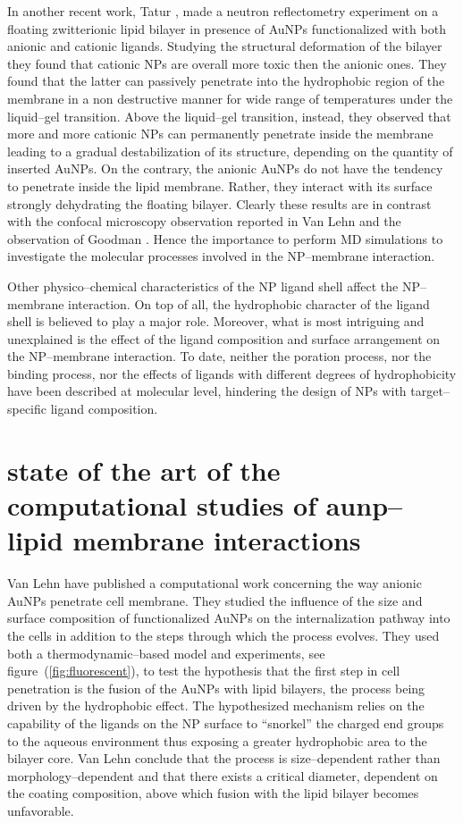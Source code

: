 In another recent work, Tatur \etal{} \cite{Maccarini2013}, made a neutron reflectometry experiment on a floating 
zwitterionic lipid bilayer in presence of \acp{AuNP} functionalized with both anionic and cationic ligands. 
Studying the structural deformation of the bilayer they found that cationic \acp{NP} are overall more toxic then 
the anionic ones. They found that the latter can passively penetrate into the hydrophobic region of the membrane 
in a non destructive manner for wide range of temperatures under the liquid--gel transition. Above the liquid--gel 
transition, instead, they observed that more and more cationic \acp{NP} can permanently penetrate inside the 
membrane leading to a gradual destabilization of its structure, depending on the quantity of inserted \acp{AuNP}. 
On the contrary, the anionic \acp{AuNP} do not have the tendency to penetrate inside the lipid membrane. Rather, 
they interact with its surface strongly dehydrating the floating bilayer. Clearly these results are in contrast 
with the confocal microscopy observation reported in Van Lehn \etal{} \cite{VanLehn2013} and the observation of 
Goodman \etal{} \cite{Goodman2004}. Hence the importance to perform \ac{MD} simulations to investigate the 
molecular processes involved in the \ac{NP}--membrane interaction.

Other physico--chemical characteristics of the \ac{NP} ligand shell affect the \ac{NP}--membrane interaction. On 
top of all, the hydrophobic character of the ligand shell is believed to play a major role. Moreover, what is most 
intriguing and unexplained is the effect of the ligand composition and surface arrangement on the 
\ac{NP}--membrane interaction. To date, neither the poration process, nor the binding process, nor the effects of 
ligands with different degrees of hydrophobicity have been described at molecular level, hindering the design of 
\acp{NP} with target--specific ligand composition.

\section{state of the art of the computational studies of aunp--lipid membrane interactions}
Van Lehn \etal{} have published a computational work \cite{VanLehn2013} concerning the way anionic \acp{AuNP} 
penetrate cell membrane. They studied the influence of the size and surface composition of functionalized 
\acp{AuNP} on the internalization pathway into the cells in addition to the steps through which the process 
evolves. They used both a thermodynamic--based model and experiments, see figure~(\ref{fig:fluorescent}), to test 
the hypothesis that the first step in cell penetration is the fusion of the \acp{AuNP} with lipid bilayers, the 
process being driven by the hydrophobic effect. The hypothesized mechanism relies on the capability of the ligands 
on the \ac{NP} surface to ``snorkel'' the charged end groups to the aqueous environment thus exposing a greater 
hydrophobic area to the bilayer core. Van Lehn \etal{} conclude that the process is size--dependent rather than 
morphology--dependent and that there exists a critical diameter, dependent on the coating composition, above which 
fusion with the lipid bilayer becomes unfavorable.

